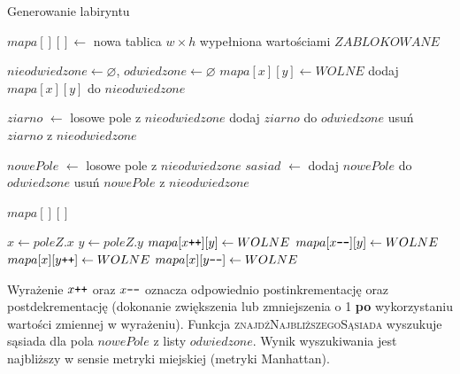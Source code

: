 \begin{algorithm}[H]
	\caption{Generowanie labiryntu}\label{alg:mazegen}
  \begin{algorithmic}[1]
 
	\State $mapa[][] \gets$ nowa tablica $w \times h$ wypełniona wartościami $ZABLOKOWANE$

	\State $nieodwiedzone \gets \varnothing$, $odwiedzone \gets \varnothing$ 
	 
		 
			\State $mapa[x][y] \gets WOLNE$
			\State dodaj $mapa[x][y]$ do $nieodwiedzone$
		\EndFor
	\EndFor

	\State $ziarno$ $\gets$ losowe pole z $nieodwiedzone$
	\State dodaj $ziarno$ do $odwiedzone$ 
	\State usuń $ziarno$ z $nieodwiedzone$

	 
		\State $nowePole$ $\gets$ losowe pole z $nieodwiedzone$
		\State $sasiad$ $\gets$ 
		\State {}
		\State dodaj $nowePole$ do $odwiedzone$ 
		\State usuń $nowePole$ z $nieodwiedzone$
	\EndWhile

	 $mapa[][]$
\EndFunction

\State 
{}
	\State $x \gets poleZ.x$
	\State $y \gets poleZ.y$
	 
		\State $mapa[x\verb-++-][y] \gets WOLNE$ 
	\EndWhile
	 
		\State $mapa[x\verb+--+][y] \gets WOLNE$ 
	\EndWhile
	 
		\State $mapa[x][y\verb-++-] \gets WOLNE$ 
	\EndWhile
	 
		\State $mapa[x][y\verb+--+] \gets WOLNE$ 
	\EndWhile
\EndFunction
  \end{algorithmic}
\end{algorithm}

Wyrażenie $x\verb-++-$ oraz $x\verb+--+$ oznacza odpowiednio postinkrementację oraz postdekrementację (dokonanie zwiększenia lub zmniejszenia o 1 {\bf po} wykorzystaniu wartości zmiennej w wyrażeniu).
Funkcja \textsc{znajdźNajbliższegoSąsiada} wyszukuje sąsiada dla pola $nowePole$ z listy $odwiedzone$. Wynik wyszukiwania jest najbliższy w sensie metryki miejskiej (metryki Manhattan).

